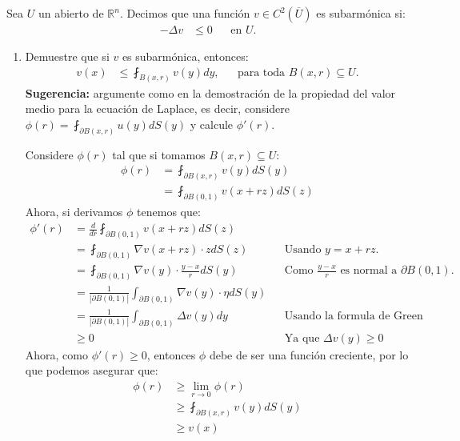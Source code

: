 \begin{homeworkProblem}
  Sea $U$ un abierto de $\mathbb{R}^{n}$. Decimos que una función $v\in C^{2}(\overline{U})$ es subarmónica si:
  \begin{align*}
    -\Delta v &\leq 0 &&\text{en $U$.} 
  \end{align*}
  \begin{enumerate}
    \item Demuestre que si $v$ es subarmónica, entonces:
      \begin{align*}
        v(x)&\leq \fint_{B(x,r)}v(y)dy, &&\text{para toda $B(x,r)\subseteq U$.}
      \end{align*}
      \textbf{Sugerencia:} argumente como en la demostración de la propiedad del valor medio para la ecuación de Laplace, es decir, considere $\phi(r)=\fint_{\partial B(x,r)}u(y)dS(y)$ y calcule $\phi'(r)$.
      \begin{solucion}
        Considere $\phi(r)$ tal que si tomamos $B(x,r)\subseteq U$:
        \begin{align*}
          \phi(r)&=\fint_{\partial B(x,r)}v(y)dS(y)\\
          &=\fint_{\partial B(0,1)}v(x+rz)dS(z)
        \end{align*}
        Ahora, si derivamos $\phi$ tenemos que:
        \begin{align*}
          \phi'(r)&=\frac{d}{dr}\fint_{\partial B(0,1)}v(x+rz)dS(z)\\
          &=\fint_{\partial B(0,1)}\nabla v(x+rz)\cdot z dS(z) &&\text{Usando $y=x+rz$.}\\
          &=\fint_{\partial B(0,1)}\nabla v(y)\cdot \frac{y-x}{r}dS(y) &&\text{Como $\frac{y-x}{r}$ es normal a $\partial B(0,1)$.}\\
          &=\frac{1}{|\partial B(0,1)|}\int_{\partial B(0,1)}\nabla v(y)\cdot \eta dS(y)\\
          &=\frac{1}{|\partial B(0,1)|}\int_{\partial B(0,1)}\Delta v(y)dy &&\text{Usando la formula de Green II.}\\
          &\geq 0 &&\text{Ya que $\Delta v(y)\geq0$}
        \end{align*}
        Ahora, como $\phi'(r)\geq 0$, entonces $\phi$ debe de ser una función creciente, por lo que podemos asegurar que:
        \begin{align*}
          \phi(r)&\geq \lim_{r\rightarrow 0} \phi(r)\\
          &\geq \fint_{\partial B(x,r)}v(y)dS(y)\\
          &\geq v(x)

\end{align*}
\end{solucion}
\end{enumerate}
\end{homeworkProblem}
